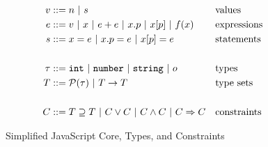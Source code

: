 \begin{figure}
\begin{align*}
v & ::= n\ |\ s && \text{values}\\
e & ::= v\ |\ x\ |\ e + e\ |\ x.p\ |\ x[p]\ |\ f(x) && \text{expressions}\\
s & ::= x = e\ |\ x.p = e\ |\ x[p] = e && \text{statements}\\
\\
\tau & ::= {\tt int}\ |\ {\tt number}\ |\ {\tt string}\ |\ o && \text{types}\\
T & ::= \mathcal{P}(\tau)\ |\ T \rightarrow T && \text{type sets}\\
\\
C & ::= T \supseteq T\ |\ C \vee C\ |\ C \wedge C\ |\ C \Rightarrow C && \text{constraints}
\end{align*}
\caption{Simplified JavaScript Core, Types, and Constraints}
\label{fig:js-core}
\end{figure}

